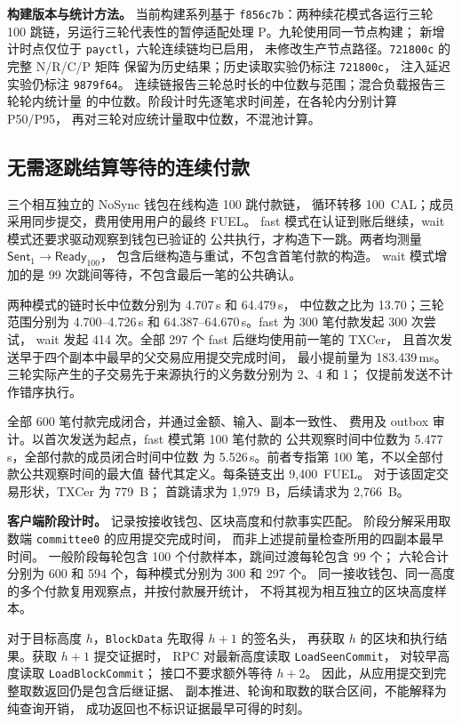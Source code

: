 \noindent\textbf{构建版本与统计方法。}
当前构建系列基于 \texttt{f856c7b}：两种续花模式各运行三轮
100 跳链，另运行三轮代表性的暂停适配处理 P。九轮使用同一节点构建；
新增计时点仅位于 \texttt{payctl}，六轮连续链均已启用，
未修改生产节点路径。\texttt{721800c} 的完整 N/R/C/P 矩阵
保留为历史结果；历史读取实验仍标注 \texttt{721800c}，
注入延迟实验仍标注 \texttt{9879f64}。
连续链报告三轮总时长的中位数与范围；混合负载报告三轮轮内统计量
的中位数。阶段计时先逐笔求时间差，在各轮内分别计算 P50/P95，
再对三轮对应统计量取中位数，不混池计算。

\subsection{无需逐跳结算等待的连续付款}

三个相互独立的 NoSync 钱包在线构造 100 跳付款链，
循环转移 100~CAL；成员采用同步提交，费用使用用户的最终 FUEL。
fast 模式在认证到账后继续，wait 模式还要求驱动观察到钱包已验证的
公共执行，才构造下一跳。两者均测量
$\mathsf{Sent}_1 \rightarrow \mathsf{Ready}_{100}$，
包含后继构造与重试，不包含首笔付款的构造。
wait 模式增加的是 99 次跳间等待，不包含最后一笔的公共确认。

两种模式的链时长中位数分别为 4.707\,s 和 64.479\,s，
中位数之比为 13.70；三轮范围分别为 4.700--4.726\,s
和 64.387--64.670\,s。fast 为 300 笔付款发起 300 次尝试，
wait 发起 414 次。全部 297 个 fast 后继均使用前一笔的 TXCer，
且首次发送早于四个副本中最早的父交易应用提交完成时间，
最小提前量为 183.439\,ms。
三轮实际产生的子交易先于来源执行的义务数分别为 2、4 和 1；
仅提前发送不计作错序执行。

全部 600 笔付款完成闭合，并通过金额、输入、副本一致性、
费用及 outbox 审计。以首次发送为起点，fast 模式第 100 笔付款的
公共观察时间中位数为 5.477\,s，全部付款的成员闭合时间中位数
为 5.526\,s。前者专指第 100 笔，不以全部付款公共观察时间的最大值
替代其定义。每条链支出 9,400~FUEL。
对于该固定交易形状，TXCer 为 779~B；
首跳请求为 1,979~B，后续请求为 2,766~B。

\noindent\textbf{客户端阶段计时。}
记录按接收钱包、区块高度和付款事实匹配。
阶段分解采用取数端 \texttt{committee0} 的应用提交完成时间，
而非上述提前量检查所用的四副本最早时间。
一般阶段每轮包含 100 个付款样本，跳间过渡每轮包含 99 个；
六轮合计分别为 600 和 594 个，每种模式分别为 300 和 297 个。
同一接收钱包、同一高度的多个付款复用观察点，并按付款展开统计，
不将其视为相互独立的区块高度样本。

对于目标高度 $h$，\texttt{BlockData} 先取得 $h+1$ 的签名头，
再获取 $h$ 的区块和执行结果。获取 $h+1$ 提交证据时，
RPC 对最新高度读取 \texttt{LoadSeenCommit}，
对较早高度读取 \texttt{LoadBlockCommit}；
接口不要求额外等待 $h+2$。
因此，从应用提交到完整取数返回仍是包含后继证据、
副本推进、轮询和取数的联合区间，不能解释为纯查询开销，
成功返回也不标识证据最早可得的时刻。

